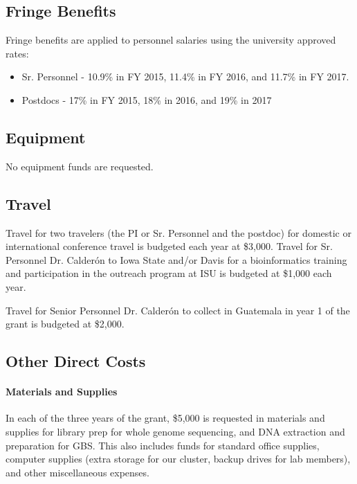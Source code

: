 \documentclass[11pt,letterpaper]{article}
\begin{document}
\subsection*{Fringe Benefits}
Fringe benefits are applied to personnel salaries using the university approved rates:
\begin{itemize}
\item Sr. Personnel - 10.9\% in FY 2015, 11.4\% in FY 2016, and 11.7\% in FY 2017.
\item Postdocs - 17\% in FY 2015, 18\% in 2016, and 19\% in 2017
\end{itemize}

\subsection*{Equipment}

No equipment funds are requested.

\subsection*{Travel}

Travel for two travelers (the PI or Sr. Personnel and the postdoc) for domestic or international conference travel is budgeted each year at \$3,000.  Travel for Sr. Personnel Dr. Calder\'{o}n to Iowa State and/or Davis for a bioinformatics training and participation in the outreach program at ISU is budgeted at \$1,000 each year.

Travel for Senior Personnel Dr. Calder\'{o}n to collect in Guatemala in year 1 of the grant is budgeted at \$2,000.

\subsection*{Other Direct Costs}

 \paragraph{Materials and Supplies}
In each of the three years of the grant, \$5,000 is requested in materials and supplies for library prep for whole genome sequencing, and DNA extraction and preparation for GBS.  This also includes funds for standard office supplies, computer supplies (extra storage for our cluster, backup drives for lab members), and other miscellaneous expenses. 
\end{document}
